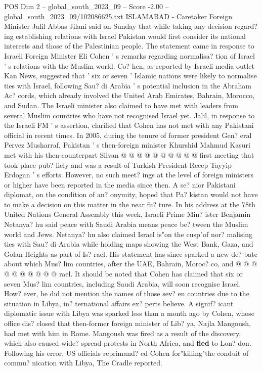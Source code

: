 \begin{textsample}{POS Dim 2 – global\_south\_2023\_09 – Score -2.00 – global\_south\_2023\_09/102086625.txt}  \label{ex:f2_pos_448}
ISLAMABAD - Caretaker Foreign Minister Jalil Abbas Jilani said on Sunday that while taking any decision regard? ing establishing relations with Israel Pakistan would first consider its national interests and those of the Palestinian people.
The statement came in response to Israeli Foreign Minister Eli Cohen ' s remarks regarding normalisa? tion of Israel ' s relations with the Muslim world.
Co? hen, as reported by Israeli media outlet Kan News, suggested that ' six or seven ' Islamic nations were likely to normalise ties with Israel, following Sau? di Arabia ' s potential inclusion in the Abraham Ac? cords, which already involved the United Arab Emirates, Bahrain, Morocco, and Sudan.
The Israeli minister also claimed to have met with leaders from several Muslim countries who have not recognised Israel yet.
Jalil, in response to the Israeli FM ' s assertion, clarified that Cohen has not met with any Pakistani official in recent times.
In 2005, during the tenure of former president Gen? eral Pervez Musharraf, Pakistan ' s then-foreign minister Khurshid Mahmud Kasuri met with his then-counterpart Silvan @ @ @ @ @ @ @ @ @ @ first meeting that took place pub? licly and was a result of Turkish President Recep Tayyip Erdogan ' s efforts.
However, no such meet? ings at the level of foreign ministers or higher have been reported in the media since then.
A se? nior Pakistani diplomat, on the condition of an? onymity, hoped that Pa? kistan would not have to make a decision on this matter in the near fu? ture.
In his address at the 78th United Nations General Assembly this week, Israeli Prime Min? ister Benjamin Netanya? hu said peace with Saudi Arabia means peace be? tween the Muslim world and Jews.
Netanya? hu also claimed Israel is"on the cusp"of nor? malising ties with Sau? di Arabia while holding maps showing the West Bank, Gaza, and Golan Heights as part of Is? rael.
His statement has since sparked a new de? bate about which Mus? lim countries, after the UAE, Bahrain, Moroc? co, and @ @ @ @ @ @ @ @ @ @ rael.
It should be noted that Cohen has claimed that six or seven Mus? lim countries, including Saudi Arabia, will soon recognise Israel.
How? ever, he did not mention the names of those sev? en countries due to the situation in Libya, in? ternational affairs ex? perts believe.
A signif? icant diplomatic issue with Libya was sparked less than a month ago by Cohen, whose office dis? closed that then-former foreign minister of Lib? ya, Najla Mangoush, had met with him in Rome.
Mangoush was fired as a result of the discovery, which also caused wide? spread protests in North Africa, and \textbf{fled} to Lon? don.
Following his error, US officials reprimand? ed Cohen for"killing"the conduit of commu? nication with Libya, The Cradle reported.

\end{textsample}
